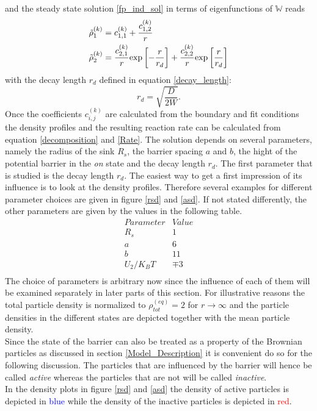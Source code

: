 and the steady state solution \eqref{fp_ind_sol} in terms of eigenfunctions of $\mathbb{W}$ reads
\begin{align}
    \tilde{\rho}_1^{(k)} &= c_{1,1}^{(k)} + \frac{c_{1,2}^{(k)}}{r} \\
    \tilde{\rho}_2^{(k)} &= \frac{c_{2,1}^{(k)}}{r}{\rm exp}\left[-\frac{r}{r_d}\right]+ \frac{c_{2,2}^{(k)}}{r}{\rm exp}\left[\frac{r}{r_d}\right]
    \label{ind_sol_U2}
\end{align}
with the decay length $r_d$ defined in equation \eqref{decay_length}:
\begin{equation}
    r_d = \sqrt{\frac{D}{2W}}.
    \label{rd_two_state}
\end{equation}
Once the coefficients $c^{(k)}_{i,j}$ are calculated from the boundary and fit conditions the density profiles and the resulting reaction rate can be calculated from equation \eqref{decomposition} and \eqref{Rate}.
The solution depends on several parameters, namely the radius of the sink $R_s$, the barrier spacing $a$ and $b$, the hight of the potential barrier in the \emph{on} state and the decay length $r_d$. The first parameter that is studied is the decay length $r_d$. The easiest way to get a first impression of its influence is to look at the density profiles. Therefore several examples for different parameter choices are given in figure \ref{rsd} and \ref{asd}.
If not stated differently, the other parameters are given by the values in the following table.
\begin{equation}
    \begin{array}{r|l}
        Parameter & Value \\ \hline
        R_s & 1 \\
        a   & 6 \\
        b   & 11 \\
        U_2/K_B T & \mp 3 \\
    \end{array} 
    \label{Parameters}
\end{equation}
 The choice of parameters is arbitrary now since the influence of each of them will be examined separately in later parts of this section.
For illustrative reasons the total particle density is normalized to $\rho_{tot}^{(eq)}=2$ for $r \rightarrow \infty$ and the particle densities in the different states are depicted together with the mean particle density. \\
Since the state of the barrier can also be treated as a property of the Brownian particles as discussed in section \ref{Model_Description} it is convenient do so for the following discussion. The particles that are influenced by the barrier will hence be called \emph{active} whereas the particles that are not will be called \emph{inactive}. \\ In the density plots in figure \ref{rsd} and \ref{asd} the density of active particles is depicted in \textcolor{blue}{blue} while the density of the inactive particles is depicted in \textcolor{red}{red}. \\
